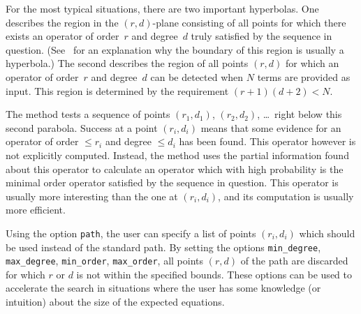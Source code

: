 \documentclass{amsart}
\begin{document}
For the most typical situations, there are two important hyperbolas. One
describes the region in the $(r,d)$-plane consisting of all points for which
there exists an operator of order~$r$ and degree~$d$ truly satisfied by the
sequence in question. (See~\cite{..} for an explanation why the boundary of this
region is usually a hyperbola.) The second describes the region of all points
$(r,d)$ for which an operator of order~$r$ and degree~$d$ can be detected when
$N$ terms are provided as input. This region is determined by the requirement
$(r+1)(d+2)<N$. 

The method tests a sequence of points $(r_1,d_1)$, $(r_2,d_2)$, \dots\ right
below this second parabola. Success at a point $(r_i,d_i)$ means that some
evidence for an operator of order $\leq r_i$ and degree $\leq d_i$ has been found. 
This operator however is not explicitly computed. Instead, the method uses the
partial information found about this operator to calculate an operator which with 
high probability is the minimal order operator satisfied by the sequence in question. 
This operator is usually more interesting than the one at $(r_i,d_i)$, and its 
computation is usually more efficient. 

Using the option \verb|path|, the user can specify a list of points $(r_i,d_i)$
which should be used instead of the standard path. By setting the options \verb|min_degree|,
\verb|max_degree|, \verb|min_order|, \verb|max_order|, all points $(r,d)$ of the path
are discarded for which $r$ or $d$ is not within the specified bounds. These options
can be used to accelerate the search in situations where the user has some knowledge
(or intuition) about the size of the expected equations. 
\end{document}
